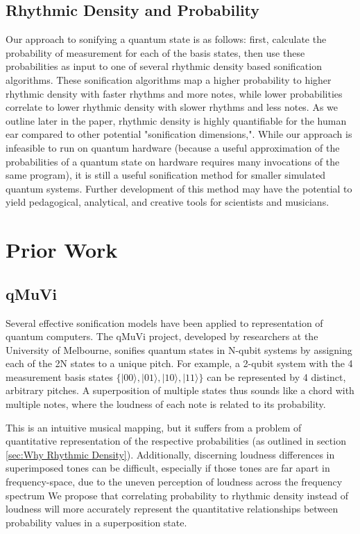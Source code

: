 \documentclass[10pt,twocolumn]{article}
\begin{document}
\subsection{Rhythmic Density and Probability}

Our approach to sonifying a quantum state is as follows: first, calculate the probability of measurement for each of the basis states, then use these probabilities as input to one of several rhythmic density based sonification algorithms. These sonification algorithms map a higher probability to higher rhythmic density with faster rhythms and more notes, while lower probabilities correlate to lower rhythmic density with slower rhythms and less notes. As we outline later in the paper, rhythmic density is highly quantifiable for the human ear compared to other potential "sonification dimensions,". While our approach is infeasible to run on quantum hardware (because a useful approximation of the probabilities of a quantum state on hardware requires many invocations of the same program), it is still a useful sonification method for smaller simulated quantum systems. Further development of this method may have the potential to yield pedagogical, analytical, and creative tools for scientists and musicians.

\section{Prior Work}

\subsection{qMuVi}

Several effective sonification models have been applied to representation of quantum computers. The qMuVi\cite{qmuvi} project, developed by researchers at the University of Melbourne, sonifies quantum states in N-qubit systems by assigning each of the 2N states to a unique pitch. For example, a 2-qubit system with the 4 measurement basis states $\{|00\rangle, |01\rangle, |10\rangle, |11\rangle\}$ can be represented by 4 distinct, arbitrary pitches. A superposition of multiple states thus sounds like a chord with multiple notes, where the loudness of each note is related to its probability.

This is an intuitive musical mapping, but it suffers from a problem of quantitative representation of the respective probabilities (as outlined in section \ref{sec:Why Rhythmic Density}). Additionally, discerning loudness differences in superimposed tones can be difficult, especially if those tones are far apart in frequency-space, due to the uneven perception of loudness across the frequency spectrum\cite{smyth2019} We propose that correlating probability to rhythmic density instead of loudness will more accurately represent the quantitative relationships between probability values in a superposition state.
\end{document}
